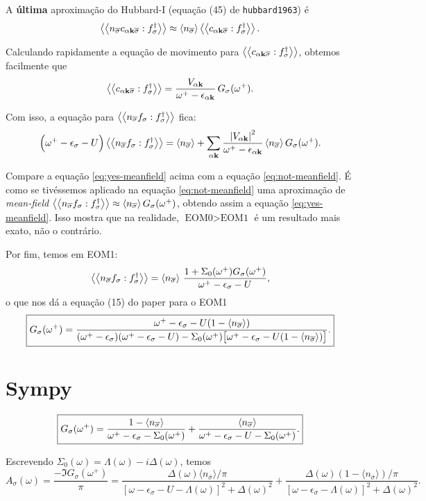 \documentclass[a4paper,fleqn,12pt]{article}
\begin{document}
A \textbf{última} aproximação do Hubbard-I (equação (45) de \texttt{hubbard1963}) é
$$
\gf{n_{\cc{\sigma}} c_{\alpha \k \cc{\sigma}}}{f_\sigma^\dagger}
\approx
\ev{n_{\cc{\sigma}}} \gf{c_{\alpha \k \cc{\sigma}}}{f_\sigma^\dagger}.
$$

Calculando rapidamente a equação de movimento para $\gf{c_{\alpha \k \cc{\sigma}}}{f_\sigma^\dagger}$, obtemos facilmente que
$$
\gf{c_{\alpha \k \cc{\sigma}}}{f_\sigma^\dagger} =
\frac{V_{\alpha \k}}{\omega^+ - \eps_{\alpha \k}} \, G_\sigma(\omega^+).
$$

Com isso, a equação para $\gf{n_{\cc{\sigma}} f_\sigma}{f_\sigma^\dagger}$ fica:
\begin{equation} \label{eq:yes-meanfield}
\Big(
\omega^+ - \eps_\sigma - U
\Big) \gf{n_{\cc{\sigma}} f_\sigma}{f_\sigma^\dagger} =
\ev{n_{\cc{\sigma}}} +
\sum_{\alpha \k} \frac{\abs{V_{\alpha \k}}^2}
{\omega^+ - \eps_{\alpha \k}} \ev{n_{\cc{\sigma}}} G_\sigma(\omega^+).
\end{equation}

Compare a equação \ref{eq:yes-meanfield} acima com a equação \ref{eq:not-meanfield}. É como se tivéssemos aplicado na equação \ref{eq:not-meanfield} uma aproximação de \textit{mean-field} $\gf{n_{\cc{\sigma}} f_\sigma}{f_\sigma^\dagger} \approx \ev{n_{\cc{\sigma}}} G_\sigma(\omega^+)$, obtendo assim a equação \ref{eq:yes-meanfield}. Isso mostra que na realidade, $\text{EOM0} > \text{EOM1}$ é um resultado mais exato, não o contrário.

Por fim, temos em EOM1:
$$
\gf{n_{\cc{\sigma}} f_\sigma}{f_\sigma^\dagger} =
\ev{n_{\cc{\sigma}}} \,
\frac{1 + \Sigma_0(\omega^+) G_\sigma(\omega^+)}{\omega^+ - \eps_\sigma - U},
$$
o que nos dá a equação (15) do paper para o EOM1
$$
\boxed{
G_\sigma(\omega^+) =
\frac{\omega^+ - \eps_\sigma - U(1-\ev{n_{\cc{\sigma}}})}
{(\omega^+ - \eps_\sigma)(\omega^+ - \eps_\sigma - U) -
\Sigma_0(\omega^+)
\big[
\omega^+ - \eps_\sigma - U(1-\ev{n_{\cc{\sigma}}})
\big]
}. }
$$

\pagebreak

\section{Sympy}

$$
\boxed{
G_\sigma(\omega^+) =
\frac{1 - \ev{n_{\cc{\sigma}}}}{\omega^+ - \eps_\sigma - \Sigma_0(\omega^+)} +
\frac{\ev{n_{\cc{\sigma}}}}{{\omega^+ - \eps_\sigma - U - \Sigma_0(\omega^+)}}.
}
$$

Escrevendo $\Sigma_0(\omega) = \Lambda(\omega) - i \Delta(\omega)$, temos
$$
\boxed{
A_\sigma(\omega) = \frac{- \Im{G_\sigma(\omega^+)}}{\pi} =
\frac{\Delta(\omega) \langle n_{\overline{\sigma}} \rangle / \pi}
{\left[\omega - \epsilon_{\sigma} - U - \Lambda(\omega)\right]^{2}+\Delta(\omega)^{2}}+\frac{\Delta(\omega) \left(1 - \langle n_{\overline{\sigma}} \rangle\right) / \pi}
{\left[\omega - \epsilon_{\sigma} - \Lambda(\omega)\right]^{2} + \Delta(\omega)^{2}}.
}
$$
\end{document}

